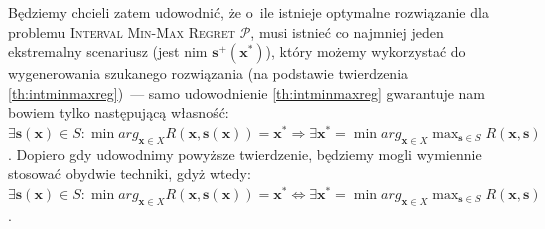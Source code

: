 Będziemy chcieli zatem udowodnić, że o~ile istnieje optymalne rozwiązanie dla problemu \textsc{Interval Min-Max Regret $\mathcal{P}$}, musi istnieć co najmniej jeden ekstremalny scenariusz (jest nim $\textbf{s}^{+} \left( \textbf{x}^{\ast} \right)$), który możemy wykorzystać do wygenerowania szukanego rozwiązania (na podstawie twierdzenia \ref{th:intminmaxreg})~--- samo udowodnienie \ref{th:intminmaxreg} gwarantuje nam bowiem tylko następującą własność: $\exists \textbf{s} \left( \textbf{x} \right) \in S : \min arg_{\textbf{x} \in X} R \left( \textbf{x}, \textbf{s} \left( \textbf{x} \right) \right) = \textbf{x}^{\ast} \Rightarrow \exists \textbf{x}^{\ast} = \min arg_{\textbf{x} \in X} \max_{\textbf{s} \in S} R \left( \textbf{x}, \textbf{s} \right)$.
Dopiero gdy udowodnimy powyższe twierdzenie, będziemy mogli wymiennie stosować obydwie techniki, gdyż wtedy: $\exists \textbf{s} \left( \textbf{x} \right) \in S : \min arg_{\textbf{x} \in X} R \left( \textbf{x}, \textbf{s} \left( \textbf{x} \right) \right) = \textbf{x}^{\ast} \Leftrightarrow \exists \textbf{x}^{\ast} = \min arg_{\textbf{x} \in X} \max_{\textbf{s} \in S} R \left( \textbf{x}, \textbf{s} \right)$.
\\
